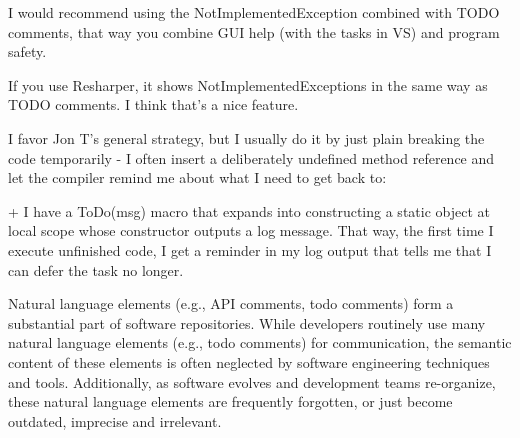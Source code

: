 \cite{squires_use_2012}
I would recommend using the NotImplementedException combined with TODO comments, that way you combine GUI help (with the tasks in VS) and program safety.

If you use Resharper, it shows NotImplementedExceptions in the same way as TODO comments. I think that's a nice feature.

\cite{tackabury_how_2019}
I favor Jon T's general strategy, but I usually do it by just plain breaking the code temporarily - I often insert a deliberately undefined method reference and let the compiler remind me about what I need to get back to:

+ I have a ToDo(msg) macro that expands into constructing a static object at local scope whose constructor outputs a log message. That way, the first time I execute unfinished code, I get a reminder in my log output that tells me that I can defer the task no longer.





\cite{nie_natural_2018}
Natural language elements (e.g., API comments, todo comments) form a substantial part of software repositories. While developers routinely use many natural language elements (e.g., todo comments) for communication, the semantic content of these elements is often neglected by software engineering techniques and tools. Additionally, as software evolves and development teams re-organize, these natural language elements are frequently forgotten, or just become outdated, imprecise and irrelevant.

